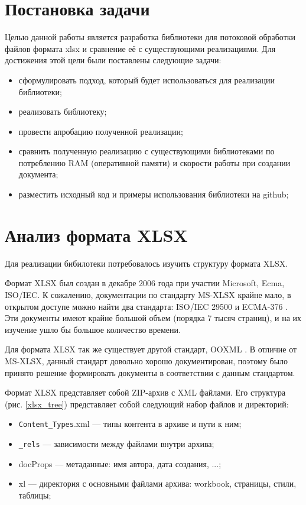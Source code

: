 \documentclass[14pt]{matmex-diploma}
\begin{document}
\section{Постановка задачи}
Целью данной работы является разработка библиотеки для потоковой обработки файлов формата xlsx и сравнение её с существующими реализациями.
Для достижения этой цели были поставлены следующие задачи:
\begin{itemize}
    \item сформулировать подход, который будет использоваться для реализации библиотеки;
    \item реализовать библиотеку;
    \item провести апробацию полученной реализации;
    \item сравнить полученную реализацию с существующими библиотеками по потреблению RAM (оперативной памяти) и скорости работы при создании документа;
    \item разместить исходный код и примеры использования библиотеки на github;
\end{itemize}

\section{Анализ формата XLSX}
Для реализации бибилотеки потребовалось изучить структуру формата XLSX.


Формат XLSX был создан в декабре 2006 года при участии Microsoft, Ecma, ISO/IEC. К сожалению, документации по стандарту MS-XLSX крайне мало, в открытом доступе можно найти два стандарта: ISO/IEC 29500 \cite{isostd} и ECMA-376 \cite{ecmastd}. Эти документы имеют крайне большой объем (порядка 7 тысяч страниц), и на их изучение ушло бы большое количество времени. 

Для формата XLSX так же существует другой стандарт, OOXML \cite{ooxml}. В отличие от MS-XLSX, данный стандарт довольно хорошо документирован, поэтому было принято решение формировать документы в соответствии с данным стандартом.

Формат XLSX представляет собой ZIP-архив с XML файлами. Его структура (рис. \ref{xlsx_tree}) представляет собой следующий набор файлов и директорий:
\begin{itemize}
    \item \texttt{Content\_Types}.xml --- типы контента в архиве и пути к ним;
    \item \texttt{\_rels} --- зависимости между файлами внутри архива;
    \item docProps --- метаданные: имя автора, дата создания, ...;
    \item xl --- директория с основными файлами архива: workbook, страницы, стили, таблицы;
\end{itemize}
\end{document}

